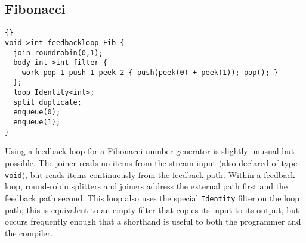 \clearpage
\subsection{Fibonacci}

\begin{lstlisting}{}
void->int feedbackloop Fib {
  join roundrobin(0,1);
  body int->int filter { 
    work pop 1 push 1 peek 2 { push(peek(0) + peek(1)); pop(); }
  };
  loop Identity<int>;
  split duplicate;
  enqueue(0);
  enqueue(1);
}
\end{lstlisting}

Using a feedback loop for a Fibonacci number generator is slightly
unusual but possible.  The joiner reads no items from the stream input
(also declared of type \lstinline|void|), but reads items continuously
from the feedback path.  Within a feedback loop, round-robin splitters
and joiners address the external path first and the feedback path
second.  This loop also uses the special \lstinline|Identity| filter
on the loop path; this is equivalent to an empty filter that copies
its input to its output, but occurs frequently enough that a shorthand
is useful to both the programmer and the compiler.

